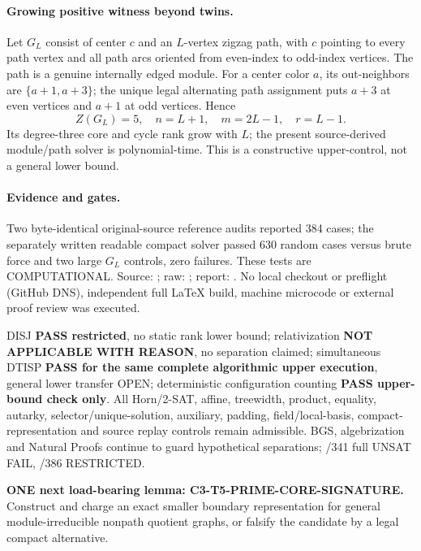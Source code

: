 \documentclass[11pt]{article}
\begin{document}
\paragraph{Growing positive witness beyond twins.}
Let $G_L$ consist of center $c$ and an $L$-vertex
zigzag path, with $c$ pointing to every path vertex
and all path arcs oriented from even-index to
odd-index vertices. The path is a genuine internally
edged module. For a center color $a$, its out-neighbors
are $\{a+1,a+3\}$; the unique legal alternating
path assignment puts $a+3$ at even vertices and
$a+1$ at odd vertices. Hence
\[
 \boxed{Z(G_L)=5,\quad n=L+1,\quad m=2L-1,\quad r=L-1}.
\]
Its degree-three core and cycle rank grow with $L$;
the present source-derived module/path solver is
polynomial-time. This is a constructive upper-control,
not a general lower bound.

\paragraph{Evidence and gates.}
Two byte-identical original-source reference audits
reported 384 cases; the separately written readable
compact solver passed 630 random cases versus brute
force and two large $G_L$ controls, zero failures.
These tests are COMPUTATIONAL. Source:
;
raw:
;
report:
.
No local checkout or preflight (GitHub DNS), independent
full LaTeX build, machine microcode or external proof
review was executed.

DISJ \textbf{PASS restricted}, no static rank lower
bound; relativization \textbf{NOT APPLICABLE WITH REASON},
no separation claimed; simultaneous DTISP \textbf{PASS
for the same complete algorithmic upper execution},
general lower transfer OPEN; deterministic configuration
counting \textbf{PASS upper-bound check only}.
All Horn/2-SAT, affine, treewidth, product, equality,
autarky, selector/unique-solution, auxiliary, padding,
field/local-basis, compact-representation and source
replay controls remain admissible. BGS, algebrization
and Natural Proofs continue to guard hypothetical
separations; /341 full UNSAT FAIL, /386 RESTRICTED.

\textbf{ONE next load-bearing lemma:
C3-T5-PRIME-CORE-SIGNATURE.} Construct and charge an
exact smaller boundary representation for general
module-irreducible nonpath quotient graphs, or falsify
the candidate by a legal compact alternative.
\end{document}
